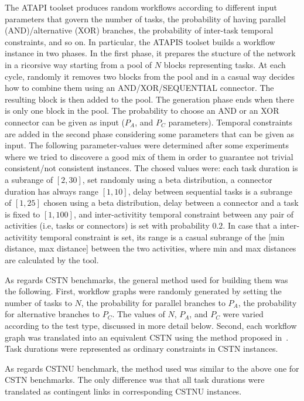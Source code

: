 \documentclass[a4paper,11pt]{article}
\begin{document}
The ATAPI toolset produces random workflows according to different input parameters that govern the number of tasks, the probability of having parallel (AND)\slash alternative (XOR) branches, the probability of inter-task temporal constraints, and so on.
In particular, the ATAPIS toolset builds a workflow instance in two phases. In the first phase, it prepares the stucture of the network in a ricorsive way starting from a pool of $N$ blocks representing tasks.
At each cycle, randomly it removes two blocks from the pool and in a casual way decides how to combine them using an AND/XOR/SEQUENTIAL connector.
The resulting block is then added to the pool. The generation phase ends when there is only one block in the pool. 
The probability to choose an AND or an XOR connector can be given as input ($P_A$, and $P_C$ parameters).
Temporal constraints are added in the second phase considering some parameters that can be given as input. 
The following parameter-values were determined after some experiments where we tried to discovere a good mix of them in order to guarantee not trivial consistent\slash not consistent instances.
The chosed values were:
each task duration is a subrange of $[2, 30]$, set randomly using a beta distribution,
a connector duration has always range $[1, 10]$, 
delay between sequential tasks is a subrange of $[1, 25]$ chosen using a beta distribution,
delay between a connector and a task is fixed to $[1, 100]$, 
and inter-activitity temporal constraint between any pair of activities (i.e, tasks or connectors) is set with probability $0.2$.
In case that a inter-activitity temporal constraint is set, its range is a casual subrange of the [min distance, max distance] between the two activities,
where min and max distances are calculated by the tool.

As regards CSTN benchmarks, the general method used for building them was the following. 
First, workflow graphs were randomly generated by setting the number of tasks to $N$, the probability for parallel branches to $P_A$, the probability for alternative branches to $P_C$. 
The values of $N$, $P_A$, and $P_C$ were varied according to the test type, discussed in more detail below. 
Second, each workflow graph was translated into an equivalent CSTN using the method proposed in~\cite{CombiGMP14}. Task durations were represented as ordinary constraints in CSTN instances.

As regards CSTNU benchmark, the method used was similar to the above one for CSTN benchmarks. The only difference was that all task durations were translated as contingent links in corresponding CSTNU instances.
\end{document}
